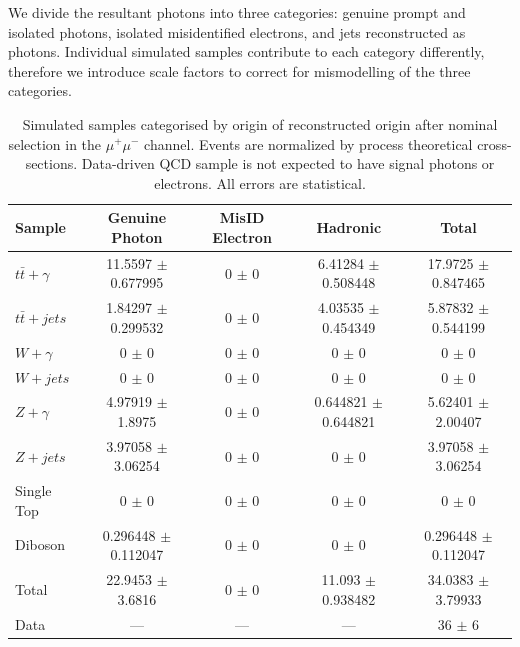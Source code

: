 We divide the resultant photons into three categories: genuine prompt and isolated photons, isolated misidentified electrons, and jets reconstructed as photons. Individual simulated samples contribute to each category differently, therefore we introduce scale factors to correct for mismodelling of the three categories. 

\begin{table}
\begin{center}
\resizebox{\columnwidth}{!} {
\begin{tabular}{l|ccc|c}
\hline
	\textbf{Sample} & \textbf{Genuine Photon} & \textbf{MisID Electron} & \textbf{Hadronic} & \textbf{Total} \\
\hline
$t\bar{t}+\gamma$  & 11.5597 $\pm$ 0.677995 & 0 $\pm$ 0 & 6.41284 $\pm$ 0.508448 & 17.9725 $\pm$ 0.847465 \\
$t\bar{t}+jets$  & 1.84297 $\pm$ 0.299532 & 0 $\pm$ 0 & 4.03535 $\pm$ 0.454349 & 5.87832 $\pm$ 0.544199 \\
$W+\gamma$  & 0 $\pm$ 0 & 0 $\pm$ 0 & 0 $\pm$ 0 & 0 $\pm$ 0 \\
$W+jets$  & 0 $\pm$ 0 & 0 $\pm$ 0 & 0 $\pm$ 0 & 0 $\pm$ 0 \\
$Z+\gamma$  & 4.97919 $\pm$ 1.8975 & 0 $\pm$ 0 & 0.644821 $\pm$ 0.644821 & 5.62401 $\pm$ 2.00407 \\
$Z+jets$  & 3.97058 $\pm$ 3.06254 & 0 $\pm$ 0 & 0 $\pm$ 0 & 3.97058 $\pm$ 3.06254 \\
Single Top  & 0 $\pm$ 0 & 0 $\pm$ 0 & 0 $\pm$ 0 & 0 $\pm$ 0 \\
Diboson  & 0.296448 $\pm$ 0.112047 & 0 $\pm$ 0 & 0 $\pm$ 0 & 0.296448 $\pm$ 0.112047 \\
\hline
Total  & 22.9453 $\pm$ 3.6816 & 0 $\pm$ 0 & 11.093 $\pm$ 0.938482 & 34.0383 $\pm$ 3.79933 \\
Data  & --- & --- & --- & 36 $\pm$ 6 \\
\hline	
\end{tabular}
}
\end{center}
\caption{Simulated samples categorised by origin of reconstructed origin after nominal selection in the $\mu^+\mu^-$ channel. Events are normalized by process theoretical cross-sections. Data-driven QCD sample is not expected to have signal photons or electrons. All errors are statistical.}
\label{tab-SigPhotonsMuMu}
\end{table}	

